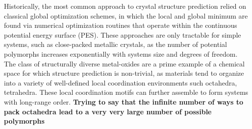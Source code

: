 %
%
Historically, the most common approach to crystal structure prediction relied on classical global optimization schemes,
in which the local and global minimum are found via numerical optimization routines that operate within the continuous potential energy surface (PES).
%
These approaches are only tractable for simple systems, such as close-packed metallic crystals,
as the number of potential polymorphs increases exponentially with systems size and degrees of freedom.\cite{Stillinger1999}
%
The class of structurally diverse metal-oxides are a prime example of a chemical space for which structure prediction is non-trivial, as materials tend to organize into a variety of well-defined local coordination environments such octahedra, tetrahedra.
%
These local coordination motifs can further assemble to form systems with long-range order.
\textbf{Trying to say that the infinite number of ways to pack octahedra lead to a very very large number of possible polymorphs}

